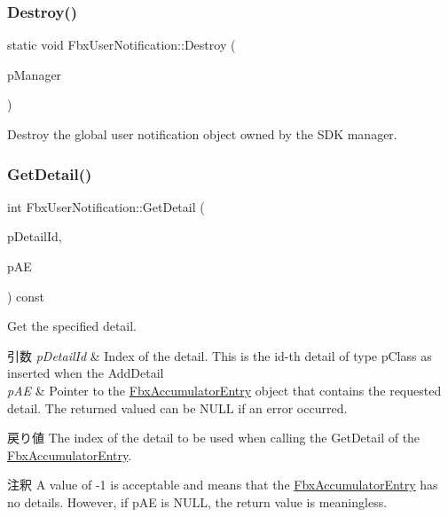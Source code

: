 \subsubsection{\texorpdfstring{Destroy()}{Destroy()}}
{\footnotesize\ttfamily static void Fbx\+User\+Notification\+::\+Destroy (\begin{DoxyParamCaption}\item[{\hyperlink{class_fbx_manager}{Fbx\+Manager} $\ast$}]{p\+Manager }\end{DoxyParamCaption})\hspace{0.3cm}{\ttfamily [static]}}

Destroy the global user notification object owned by the S\+DK manager. \mbox{\label{class_fbx_user_notification_ae006edb0dda9a27ef1773494d254906e}} 
\subsubsection{\texorpdfstring{Get\+Detail()}{GetDetail()}}
{\footnotesize\ttfamily int Fbx\+User\+Notification\+::\+Get\+Detail (\begin{DoxyParamCaption}\item[{int}]{p\+Detail\+Id,  }\item[{const \hyperlink{class_fbx_accumulator_entry}{Fbx\+Accumulator\+Entry} $\ast$\&}]{p\+AE }\end{DoxyParamCaption}) const}

Get the specified detail. 
\begin{DoxyParams}{引数}
{\em p\+Detail\+Id} & Index of the detail. This is the id-\/th detail of type p\+Class as inserted when the Add\+Detail \\
\hline
{\em p\+AE} & Pointer to the \hyperlink{class_fbx_accumulator_entry}{Fbx\+Accumulator\+Entry} object that contains the requested detail. The returned valued can be N\+U\+LL if an error occurred. \\
\hline
\end{DoxyParams}
\begin{DoxyReturn}{戻り値}
The index of the detail to be used when calling the Get\+Detail of the \hyperlink{class_fbx_accumulator_entry}{Fbx\+Accumulator\+Entry}. 
\end{DoxyReturn}
\begin{DoxyRemark}{注釈}
A value of -\/1 is acceptable and means that the \hyperlink{class_fbx_accumulator_entry}{Fbx\+Accumulator\+Entry} has no details. However, if p\+AE is N\+U\+LL, the return value is meaningless. 
\end{DoxyRemark}
\mbox{\label{class_fbx_user_notification_afde8bbb200efe632e2df0a81413f4476}} 
